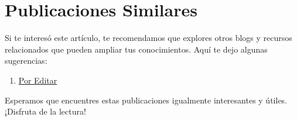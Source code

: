 \documentclass[
  jou,
  floatsintext,
  longtable,
  a4paper,
  nolmodern,
  notxfonts,
  notimes,
  colorlinks=true,linkcolor=blue,citecolor=blue,urlcolor=blue]{apa7}
\providecommand{\tightlist}{%
  \setlength{\itemsep}{0pt}\setlength{\parskip}{0pt}}
\begin{document}
\section{Publicaciones Similares}\label{publicaciones-similares}

Si te interesó este artículo, te recomendamos que explores otros blogs y
recursos relacionados que pueden ampliar tus conocimientos. Aquí te dejo
algunas sugerencias:

\begin{enumerate}
\def\labelenumi{\arabic{enumi}.}
\tightlist
\item
  \href{https://achalmaedison.netlify.app/gestion-publica-herramientas/posts/2024-03-31-por-editar/index.pdf}{}
  \href{https://achalmaedison.netlify.app/gestion-publica-herramientas/posts/2024-03-31-por-editar}{Por
  Editar}
\end{enumerate}

Esperamos que encuentres estas publicaciones igualmente interesantes y
útiles. ¡Disfruta de la lectura!
\end{document}
